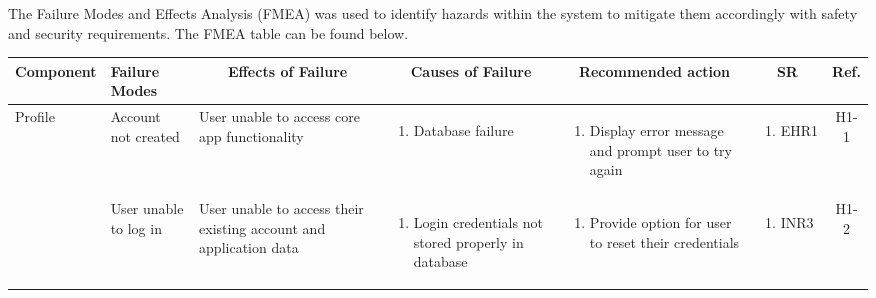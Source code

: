 \documentclass{article}
\begin{document}
    The Failure Modes and Effects Analysis (FMEA) was used to identify hazards within the system to mitigate them accordingly with safety and security requirements. The FMEA table can be found below.

    \renewcommand{\arraystretch}{1.5}
    \begin{longtable}{|p{1.7cm}|p{1.7cm} p{2.4cm} p{2.4cm} p{3.5cm} p{1.6cm} c|}
        \hline
        \multicolumn{1}{|c|}{Component} & \multicolumn{1}{p{1.5cm}}{Failure Modes} & \multicolumn{1}{c}{Effects of Failure} & \multicolumn{1}{c}{Causes of Failure} & \multicolumn{1}{c}{Recommended action} & \multicolumn{1}{c}{SR} & \multicolumn{1}{c|}{Ref.}\\
        \hline
        Profile & Account not created & User unable to access core app functionality & \vspace*{-\baselineskip}\begin{enumerate}[label=\alph*., left=0pt, nosep]\item Database failure \end{enumerate} & \vspace*{-\baselineskip}\begin{enumerate}[label=\alph*., left=0pt, nosep]\item Display error message and prompt user to try again \end{enumerate} & \vspace*{-\baselineskip}\begin{enumerate}[label=\alph*., left=0pt, nosep] \item EHR1 \end{enumerate} & H1-1\\
        \hline
        & User unable to log in & User unable to access their existing account and application data & \vspace*{-\baselineskip}\begin{enumerate}[label=\alph*., left=0pt, nosep]\item Login credentials not stored properly in database \end{enumerate} & \vspace*{-\baselineskip}\begin{enumerate}[label=\alph*., left=0pt, nosep]\item Provide option for user to reset their credentials \end{enumerate} & \vspace*{-\baselineskip}\begin{enumerate}[label=\alph*., left=0pt, nosep] \item INR3 \end{enumerate} & H1-2\\

\end{longtable}
\end{document}
